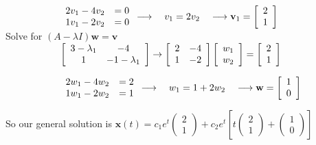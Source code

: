 \documentclass[12pt]{article}
\begin{document}
\begin{enumerate}
    $\hspace*{2cm}\begin{array}{rr} 2v_1 - 4v_2 &=0 \\ 1v_1 - 2v_2 &=0 \end{array} 
     \longrightarrow \quad v_1=2v_2 \quad \longrightarrow \mathbf{v}_1 =\left[\begin{array}{cc} 2 \\ 1 \end{array}\right]$ \\

    \hspace*{2cm}Solve for $ (A - \lambda I)\mathbf{w} = \mathbf{v}$ \\ 
    $\hspace*{2cm}\left[\begin{array}{cc} 3 - \lambda_1 & -4\\ 1 & -1 - \lambda_1\end{array}\right]
    \rightarrow \left[\begin{array}{rr} 2& -4\\ 1 & -2 \end{array}\right] \left[\begin{array}{cc} w_1 \\ w_2 \end{array}\right] = \left[\begin{array}{cc} 2 \\ 1 \end{array}\right]$

    $\hspace*{2cm}\begin{array}{rr} 2w_1 - 4w_2 &=2 \\ 1w_1 - 2w_2 &=1 \end{array} 
    \longrightarrow \quad w_1=1 + 2w_2 \quad \longrightarrow \mathbf{w} =\left[\begin{array}{cc} 1 \\ 0 \end{array}\right]$

    So our general solution is $\mathbf{x}(t) = c_1e^{t} \begin{pmatrix} 2 \\ 1 \end{pmatrix}+ c_2e^{t} \left[ t \begin{pmatrix} 2 \\ 1 \end{pmatrix} + \begin{pmatrix} 1 \\ 0 \end{pmatrix}\right]$

\end{enumerate}
\end{document}
